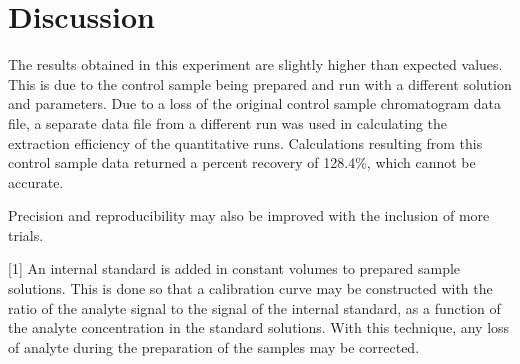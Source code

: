 \documentclass{article}
\begin{document}
\begin{multicols}{2}
{
\begin{center}
\label{tab:data}
\end{center}

\begin{center}
    \label{tab:data2}
\end{center}

\section*{Discussion}
The results obtained in this experiment are slightly higher than expected
values. \cite{mayo} This is due to the control sample being prepared and run
with a different solution and parameters. Due to a loss of the original control
sample chromatogram data file, a separate data file from a different run was
used in calculating the extraction efficiency of the quantitative runs.
Calculations resulting from this control sample data returned a percent recovery of
128.4\%, which cannot be accurate.

Precision and reproducibility may also be improved with the inclusion of more trials.


[1] An internal standard is added in constant volumes to prepared sample
solutions. This is done so that a calibration curve may be constructed with the
ratio of the analyte signal to the signal of the internal standard, as a
function of the analyte concentration in the standard solutions. With this
technique, any loss of analyte during the preparation of the samples may be
corrected.

}
\end{multicols}
\end{document}
